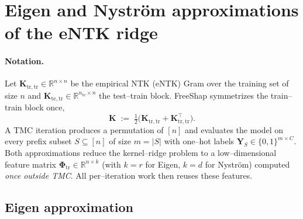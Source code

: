 
\section{Eigen and Nystr\"om approximations of the eNTK ridge}

\paragraph{Notation.}
Let $\mathbf{K}_{\mathrm{tr,tr}}\!\in\!\mathbb{R}^{n\times n}$ be the empirical NTK (eNTK) Gram over the training set of size $n$ and $\mathbf{K}_{\mathrm{te,tr}}\!\in\!\mathbb{R}^{n_{\mathrm{te}}\times n}$ the test--train block.
FreeShap symmetrizes the train--train block once,
\begin{equation*}
\mathbf{K} \;:=\; \tfrac{1}{2}\bigl(\mathbf{K}_{\mathrm{tr,tr}}+\mathbf{K}_{\mathrm{tr,tr}}^{\!\top}\bigr).
\end{equation*}
A TMC iteration produces a permutation of $[n]$ and evaluates the model on every prefix subset $S\!\subseteq\![n]$ of size $m=|S|$ with one--hot labels $\mathbf{Y}_S\!\in\!\{0,1\}^{m\times C}$. Both approximations reduce the kernel--ridge problem to a low--dimensional feature matrix $\boldsymbol{\Phi}_{\mathrm{tr}}\!\in\!\mathbb{R}^{n\times k}$ (with $k=r$ for Eigen, $k=d$ for Nystr\"om) computed \emph{once outside TMC}. All per--iteration work then reuses these features.

\subsection{Eigen approximation}

